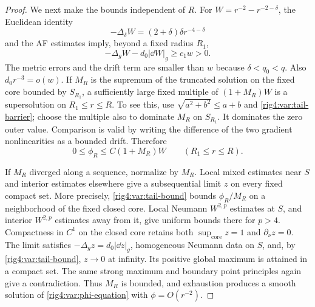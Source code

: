 \begin{proof}
We next make the bounds independent of $R$. For
$W=r^{-2}-r^{-2-\delta}$, the Euclidean identity
\[
 -\Delta_\delta W=(2+\delta)\delta r^{-4-\delta}
\]
and the AF estimates imply, beyond a fixed radius $R_1$,
\begin{equation}
 -\Delta_g W-d_0|\dd W|_g\ge c_1w>0.
\label{rig4:var:tail-barrier}
\end{equation}
The metric errors and the drift term are smaller than $w$ because
$\delta<q_0<q$. Also $d_0r^{-3}=o(w)$.
If $M_R$ is the supremum of the truncated solution on the fixed core
bounded by $S_{R_1}$, a sufficiently large fixed multiple of
$(1+M_R)W$ is a supersolution on $R_1\le r\le R$. To see this, use
$\sqrt{a^2+b^2}\le a+b$ and \eqref{rig4:var:tail-barrier}; choose the multiple
also to dominate $M_R$ on $S_{R_1}$. It dominates the zero outer value.
Comparison is valid by writing the difference of the two gradient
nonlinearities as a bounded drift. Therefore
\begin{equation}
 0\le\phi_R\le C(1+M_R)W\qquad (R_1\le r\le R).
\label{rig4:var:tail-bound}
\end{equation}

If $M_R$ diverged along a sequence, normalize by $M_R$. Local mixed
estimates near $S$ and interior estimates elsewhere give a subsequential
limit $z$ on every fixed compact set. More precisely,
\eqref{rig4:var:tail-bound} bounds $\phi_R/M_R$ on a neighborhood of the fixed
closed core. Local Neumann $W^{2,p}$ estimates at $S$, and interior
$W^{2,p}$ estimates away from it, give uniform bounds there for $p>4$.
Compactness in $C^1$ on the closed core retains both
$\sup_{\mathrm{core}}z=1$ and $\partial_\nu z=0$.
The limit satisfies
$-\Delta_gz=d_0|\dd z|_g$, homogeneous Neumann data on $S$, and,
by \eqref{rig4:var:tail-bound}, $z\to0$ at infinity. Its positive global maximum
is attained in a compact set. The same strong maximum and boundary point
principles again give a contradiction. Thus $M_R$ is bounded, and
exhaustion produces a smooth solution of \eqref{rig4:var:phi-equation} with
$\phi=O(r^{-2})$.


\end{proof}
